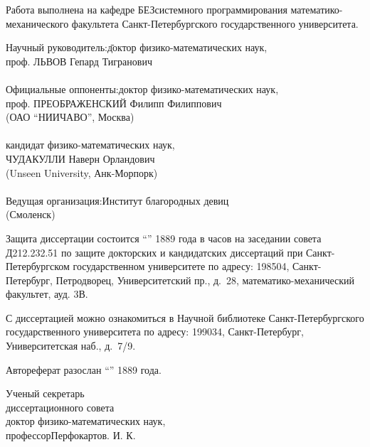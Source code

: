 \documentclass[14pt,a4paper,twoside]{extarticle}
\newcommand{\lquot}{``}
\newcommand{\rquot}{''}
\begin{document}
\thispagestyle{empty}
{Работа выполнена на кафедре БЕЗсистемного программирования ма\-те\-ма\-ти\-ко-ме\-ха\-ни\-чес\-ко\-го
факультета Санкт-Петербургского государственного университета.

\vspace{0.8cm}

\begin{tabbing}
Научный руководитель:\quad\quad\=доктор физико-математических наук,\\
\quad\>проф. ЛЬВОВ Гепард Тигранович\\
\>\\
Официальные оппоненты:\>доктор физико-математических наук,\\
\quad\>проф. ПРЕОБРАЖЕНСКИЙ Филипп Филиппович\\
\quad\>(ОАО \lquot НИИЧАВО\rquot, Москва)\\
\>\\
\>кандидат физико-математических наук,\\
\quad\>ЧУДАКУЛЛИ Наверн Орландович\\
\quad\>(Unseen University, Анк-Морпорк)\\
\>\\
Ведущая организация:\>Институт благородных девиц\\
\quad\>(Смоленск)\\
\>
\end{tabbing}


\vspace{0.8cm}
\noindent Защита диссертации состоится ``\underline{\phantom{332}}''\underline{\phantom{xxxxxxxxxx}} 1889 года
в \underline{\phantom{25}} часов на заседании совета Д212.232.51 по защите
докторских и кандидатских диссертаций при Санкт-Петербургском государственном университете по адресу: 198504, Санкт-Петербург, Петродворец, Университетский пр., д.~28, математико-механический факультет, ауд. 3В.

\vspace{0.8cm}
\noindent С диссертацией можно ознакомиться в Научной библиотеке Санкт-Пе\-тер\-бург\-ского государственного
университета по адресу: 199034, Санкт-Петербург, Университетская наб., д.~7/9.

\vspace{0.8cm}
Автореферат разослан ``\underline{\phantom{332}}''\underline{\phantom{xxxxxxxxxx}} 1889 года.

\vspace{2.5cm}
\noindent Ученый секретарь\\
диссертационного совета\\
доктор физико-математических наук,\\
профессор\phantom{xxxxxxxxxxxxxxxxxxxxxxxxxxxxxxxxxxxxxx}Перфокартов. И. К.
}
\end{document}
